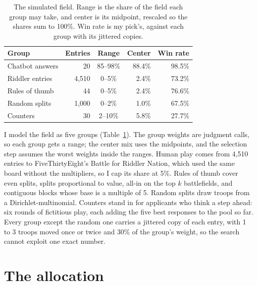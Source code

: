\documentclass[10pt,a4paper,twocolumn]{article}
\begin{document}
\begin{table}[t]
\centering\small
\caption{The simulated field.
Range is the share of the field each group may take, and center is its midpoint, rescaled so the shares sum to 100\%.
Win rate is my pick's, against each group with its jittered copies.}
\label{tab:field}
\begin{tabular}{@{}lrcrr@{}}
\toprule
Group & Entries & Range & Center & Win rate \\
\midrule
Chatbot answers & 20 & 85--98\% & 88.4\% & 98.5\% \\
Riddler entries & 4,510 & 0--5\% & 2.4\% & 73.2\% \\
Rules of thumb & 44 & 0--5\% & 2.4\% & 76.6\% \\
Random splits & 1,000 & 0--2\% & 1.0\% & 67.5\% \\
Counters & 30 & 2--10\% & 5.8\% & 27.7\% \\
\bottomrule
\end{tabular}
\end{table}

I model the field as five groups (Table~\ref{tab:field}).
The group weights are judgment calls, so each group gets a range; the center mix uses the midpoints, and the selection step assumes the worst weights inside the ranges.
Human play comes from 4,510 entries to FiveThirtyEight's Battle for Riddler Nation, which used the same board without the multipliers, so I cap its share at 5\%.
Rules of thumb cover even splits, splits proportional to value, all-in on the top $k$ battlefields, and contiguous blocks whose base is a multiple of 5.
Random splits draw troops from a Dirichlet-multinomial.
Counters stand in for applicants who think a step ahead: six rounds of fictitious play, each adding the five best responses to the pool so far.
Every group except the random one carries a jittered copy of each entry, with 1 to 3 troops moved once or twice and 30\% of the group's weight, so the search cannot exploit one exact number.

\section{The allocation}
\end{document}
